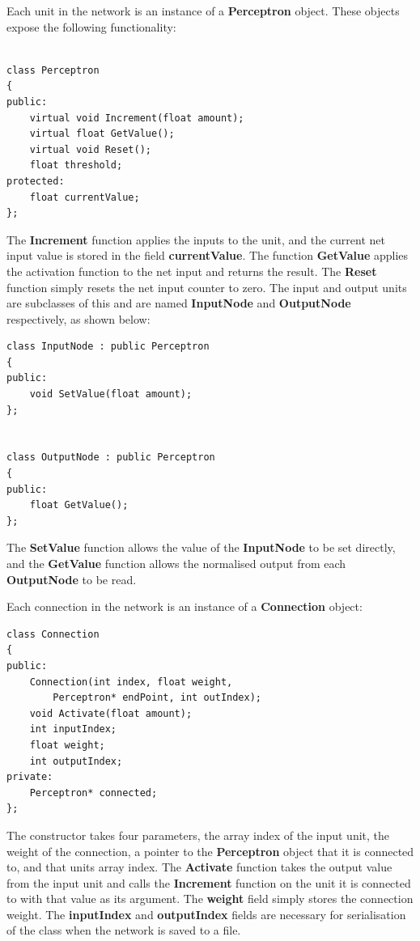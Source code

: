 \documentclass{acm_proc_article-sp}
\begin{document}
\vspace{3.2mm}

Each unit in the network is an instance of a \textbf{Perceptron} object. These objects expose the following functionality:

\begin{verbatim}

class Perceptron
{
public:
    virtual void Increment(float amount);
    virtual float GetValue();
    virtual void Reset();
    float threshold;
protected:
    float currentValue;	
};
\end{verbatim}

The \textbf{Increment} function applies the inputs to the unit, and the current net input value is stored in the field \textbf{currentValue}. The function \textbf{GetValue} applies the activation function to the net input and returns the result. The \textbf{Reset} function simply resets the net input counter to zero. The input and output units are subclasses of this and are named \textbf{InputNode} and \textbf{OutputNode} respectively, as shown below:

\begin{verbatim}
class InputNode : public Perceptron
{
public:
    void SetValue(float amount);
};


class OutputNode : public Perceptron
{
public:
    float GetValue();
};
\end{verbatim}

The \textbf{SetValue} function allows the value of the \textbf{InputNode} to be set directly, and the \textbf{GetValue} function allows the normalised output from each \textbf{OutputNode} to be read.

\vspace{4.2mm}

Each connection in the network is an instance of a \textbf{Connection} object:

\begin{verbatim}
class Connection
{
public:
    Connection(int index, float weight, 
        Perceptron* endPoint, int outIndex);
    void Activate(float amount);
    int inputIndex;
    float weight;
    int outputIndex;
private:
    Perceptron* connected;
};
\end{verbatim}

The constructor takes four parameters, the array index of the input unit, the weight of the connection, a pointer to the \textbf{Perceptron} object that it is connected to, and that units array index. The \textbf{Activate} function takes the output value from the input unit and calls the \textbf{Increment} function on the unit it is connected to with that value as its argument. The \textbf{weight} field simply stores the connection weight. The \textbf{inputIndex} and \textbf{outputIndex} fields are necessary for serialisation of the class when the network is saved to a file.
\end{document}

